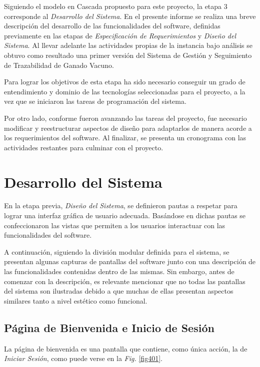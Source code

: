 \documentclass[11pt,oneside]{book}
\begin{document}
Siguiendo el modelo en Cascada propuesto para este proyecto, la etapa $3$ corresponde al \textit{Desarrollo del Sistema}. En el presente informe se realiza una breve descripción del desarrollo de las funcionalidades del software, definidas previamente en las etapas de \textit{Especificación de Requerimientos} y \textit{Diseño del Sistema}. Al llevar adelante las actividades propias de la instancia bajo análisis se obtuvo como resultado una primer versión del Sistema de Gestión y Seguimiento de Trazabilidad de Ganado Vacuno.

Para lograr los objetivos de esta etapa ha sido necesario conseguir un grado de entendimiento y dominio de las tecnologías seleccionadas para el proyecto, a la vez que se iniciaron las tareas de programación del sistema.

Por otro lado, conforme fueron avanzando las tareas del proyecto, fue necesario modificar y reestructurar aspectos de diseño para adaptarlos de manera acorde a los requerimientos del software. Al finalizar, se presenta un cronograma con las actividades restantes para culminar con el proyecto.

\section{Desarrollo del Sistema}

En la etapa previa, \textit{Diseño del Sistema}, se definieron pautas a respetar para lograr una interfaz gráfica de usuario adecuada. Basándose en dichas pautas se confeccionaron las vistas que permiten a los usuarios interactuar con las funcionalidades del software.

A continuación, siguiendo la división modular definida para el sistema, se presentan algunas capturas de pantallas del software junto con una descripción de las funcionalidades contenidas dentro de las mismas. Sin embargo, antes de comenzar con la descripción, es relevante mencionar que no todas las pantallas del sistema son ilustradas debido a que muchas de ellas presentan aspectos similares tanto a nivel estético como funcional.

\subsection{Página de Bienvenida e Inicio de Sesión}
La página de bienvenida es una pantalla que contiene, como única acción, la de \textit{Iniciar Sesión}, como puede verse en la \textit{Fig.} \eqref{fig401}.
\end{document}
